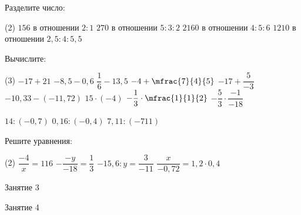 \begin{homework}[number=1]
	\begin{listofex}
		\item Разделите число:
		\begin{tasks}(2)
			\task \( 156 \) в отношении \( 2:1 \)
			\task \( 270 \) в отношении \( 5:3:2 \)
			\task \( 2160 \) в отношении \( 4:5:6 \)
			\task \( 1210 \) в отношении \( 2,5:4:5,5 \)
		\end{tasks}
		\item Вычислите:
		\begin{tasks}(3)
			\task \( -17 + 21 \)
			\task \( -8,5 - 0,6 \)
			\task \( \dfrac{1}{6} - 13,5 \)
			\task \( -4 + \mfrac{7}{4}{5} \)
			\task \( -17 + \dfrac{5}{-3} \)
			\task \( -10,33 - (-11,72) \)
			\task \( 15 \cdot (-4) \)
			\task \( -\dfrac{1}{3} \cdot \mfrac{1}{1}{2} \)
			\task \( -\dfrac{5}{3}\cdot \dfrac{-1}{-18} \)
			
			\task \( 14 : (-0,7) \)
			\task \( 0,16 : (-0,4) \)
			\task \( 7,11 : (-711) \)
		\end{tasks}
		\item Решите уравнения:
		\begin{tasks}(2)
			\task \( \dfrac{-4}{x}=116 \)
			\task \( -\dfrac{-y}{-18}=\dfrac{1}{3} \)
			\task \( -15,6:y=\dfrac{3}{-11} \)
			\task \( \dfrac{x}{-0,72}=1,2 \cdot 0,4 \)
		\end{tasks}
	\end{listofex}
\end{homework}

\begin{class}[number=3]
	\begin{listofex}
		\item Занятие 3 
	\end{listofex}
\end{class}

\begin{class}[number=4]
	\begin{listofex}
		\item Занятие 4
	\end{listofex}
\end{class}

